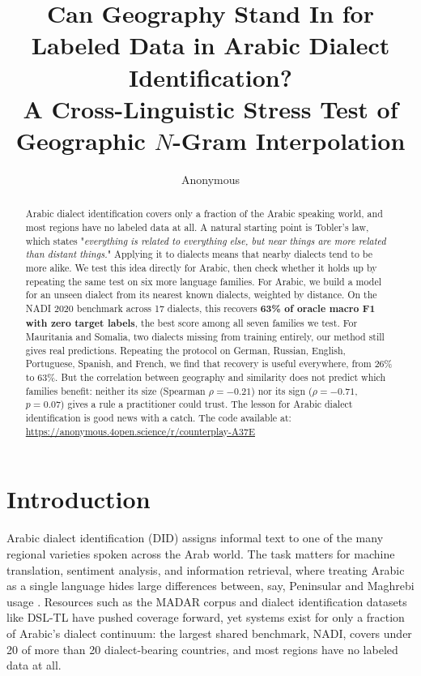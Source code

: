 \documentclass[11pt]{article}
\title{Can Geography Stand In for Labeled Data in Arabic Dialect Identification?\\ A Cross-Linguistic Stress Test of Geographic $N$-Gram Interpolation}
\author{Anonymous}
\begin{document}
\maketitle

\begin{abstract}
Arabic dialect identification covers only a fraction of the Arabic speaking world, and most regions have no labeled data at all.
A natural starting point is Tobler's law, which states "\textit{everything is related to everything else, but near things are more related than distant things.}" Applying it to dialects means that nearby dialects tend to be more alike.
We test this idea directly for Arabic, then check whether it holds up by repeating the same test on six more language families.
For Arabic, we build a model for an unseen dialect from its nearest known dialects, weighted by distance.
On the NADI 2020 benchmark across 17 dialects, this recovers \textbf{63\% of oracle macro F1 with zero target labels}, the best score among all seven families we test.
For Mauritania and Somalia, two dialects missing from training entirely, our method still gives real predictions.
Repeating the protocol on German, Russian, English, Portuguese, Spanish, and French, we find that recovery is useful everywhere, from 26\% to 63\%.
But the correlation between geography and similarity does not predict which families benefit: neither its size (Spearman $\rho{=}{-}0.21$) nor its sign ($\rho{=}{-}0.71$, $p{=}0.07$) gives a rule a practitioner could trust.
The lesson for Arabic dialect identification is good news with a catch.
The code available at: \url{https://anonymous.4open.science/r/counterplay-A37E}
\end{abstract}

\section{Introduction}
\label{sec:intro}

Arabic dialect identification (DID) assigns informal text to one of the many regional varieties spoken across the Arab world.
The task matters for machine translation, sentiment analysis, and information retrieval, where treating Arabic as a single language hides large differences between, say, Peninsular and Maghrebi usage \cite{zaidan-callison-burch-2014-arabic}.
Resources such as the MADAR corpus \cite{bouamor-etal-2018-madar} and dialect identification datasets like DSL-TL \cite{haapanen-etal-2023-dsltl} have pushed coverage forward, yet systems exist for only a fraction of Arabic's dialect continuum: the largest shared benchmark, NADI, covers under 20 of more than 20 dialect-bearing countries, and most regions have no labeled data at all.
\end{document}
